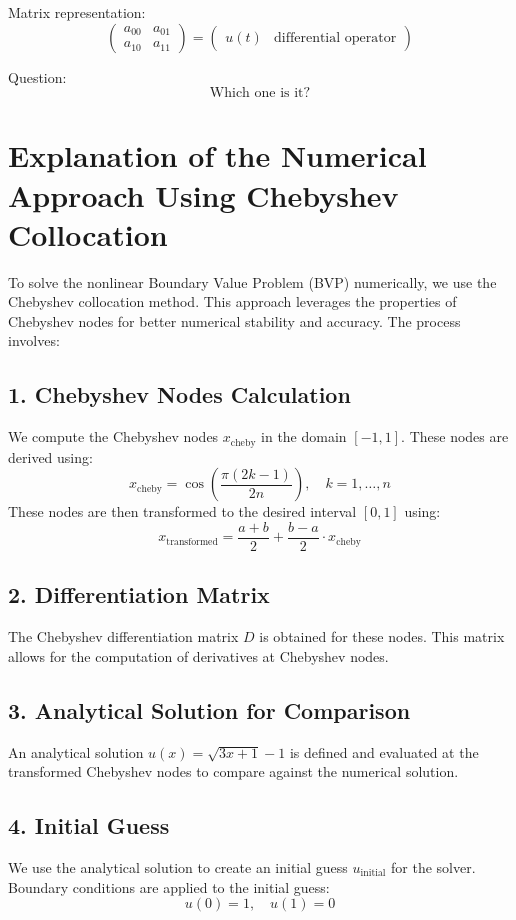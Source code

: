 \documentclass[12pt]{report} %
\begin{document}
Matrix representation:
\[
\left( 
\begin{matrix} 
a_{00} & a_{01} \\ 
a_{10} & a_{11} 
\end{matrix} 
\right)
=
\left( 
\begin{matrix} 
u(t) & \text{differential operator} 
\end{matrix} 
\right)
\]

Question:
\[
\text{Which one is it?}
\]

\section*{Explanation of the Numerical Approach Using Chebyshev Collocation}

To solve the nonlinear Boundary Value Problem (BVP) numerically, we use the Chebyshev collocation method. This approach leverages the properties of Chebyshev nodes for better numerical stability and accuracy. The process involves:

\subsection*{1. Chebyshev Nodes Calculation}
We compute the Chebyshev nodes \( x_{\text{cheby}} \) in the domain \( [-1, 1] \). These nodes are derived using:
\[
x_{\text{cheby}} = \cos\left(\frac{\pi (2k - 1)}{2n}\right), \quad k = 1, \ldots, n
\]
These nodes are then transformed to the desired interval \( [0, 1] \) using:
\[
x_{\text{transformed}} = \frac{a + b}{2} + \frac{b - a}{2} \cdot x_{\text{cheby}}
\]

\subsection*{2. Differentiation Matrix}
The Chebyshev differentiation matrix \( D \) is obtained for these nodes. This matrix allows for the computation of derivatives at Chebyshev nodes.

\subsection*{3. Analytical Solution for Comparison}
An analytical solution \( u(x) = \sqrt{3x + 1} - 1 \) is defined and evaluated at the transformed Chebyshev nodes to compare against the numerical solution.

\subsection*{4. Initial Guess}
We use the analytical solution to create an initial guess \( u_{\text{initial}} \) for the solver. Boundary conditions are applied to the initial guess:
\[
u(0) = 1, \quad u(1) = 0
\]
\end{document}
